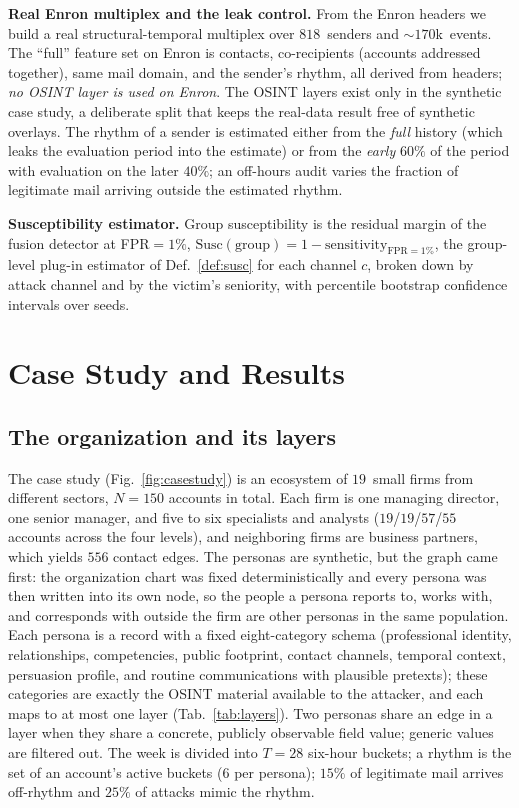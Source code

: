 \documentclass[conference]{IEEEtran}
\begin{document}
\textbf{Real Enron multiplex and the leak control.} From the Enron headers we build a real
structural-temporal multiplex over $818$~senders and $\sim\!170$k~events. The ``full'' feature set on Enron
is contacts, co-recipients (accounts addressed together), same mail domain, and the sender's rhythm, all
derived from headers; \emph{no OSINT layer is used on Enron}. The OSINT layers exist only in the synthetic
case study, a deliberate split that keeps the real-data result free of synthetic overlays. The rhythm of a sender is estimated either
from the \emph{full} history (which leaks the evaluation period into the estimate) or from the \emph{early}
$60\%$ of the period with evaluation on the later $40\%$; an off-hours audit varies the fraction of legitimate
mail arriving outside the estimated rhythm.

\textbf{Susceptibility estimator.} Group susceptibility is the residual margin of the fusion detector at
FPR$=1\%$, $\mathrm{Susc}(\text{group}) = 1 - \text{sensitivity}_{\text{FPR}=1\%}$, the group-level plug-in
estimator of Def.~\ref{def:susc} for each channel $c$, broken down by attack channel and by the victim's seniority, with
percentile bootstrap confidence intervals over seeds.

\section{Case Study and Results}
\label{sec:results}

\subsection{The organization and its layers}
The case study (Fig.~\ref{fig:casestudy}) is an ecosystem of $19$~small firms from different sectors,
$N{=}150$ accounts in total. Each firm is one managing director, one senior manager, and five to six
specialists and analysts ($19$/$19$/$57$/$55$ accounts across the four levels), and neighboring firms are
business partners, which yields $556$ contact edges. The personas are synthetic, but the graph came first:
the organization chart was fixed deterministically and every persona was then written into its own node, so
the people a persona reports to, works with, and corresponds with outside the firm are other personas in the
same population. Each persona is a record with a fixed eight-category schema (professional identity,
relationships, competencies, public footprint, contact channels, temporal context, persuasion profile, and
routine communications with plausible pretexts); these categories are exactly the OSINT material available
to the attacker, and each maps to at most one layer (Tab.~\ref{tab:layers}). Two personas share an edge in a
layer when they share a concrete, publicly observable field value; generic values are filtered out. The week
is divided into $T{=}28$ six-hour buckets; a rhythm is the set of an account's active buckets ($6$ per
persona); $15\%$ of legitimate mail arrives off-rhythm and $25\%$ of attacks mimic the rhythm.
\end{document}
